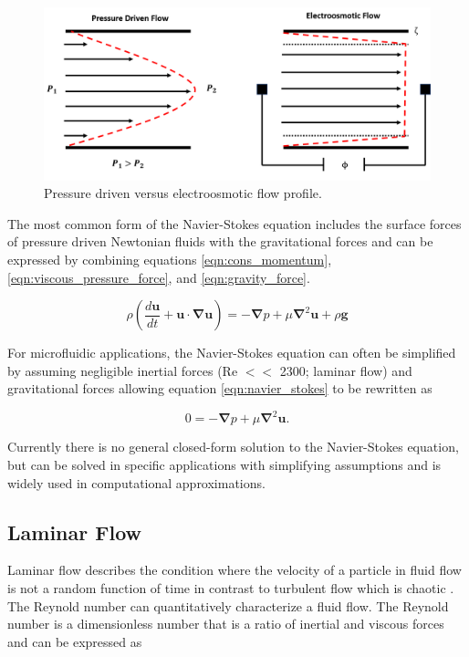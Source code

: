 \begin{figure}[ht]
    \centering
    \includegraphics[width = \textwidth]{images/plugVsParabolic.png}
    \caption[Pressure driven versus electroosmotic flow profile]{Pressure driven versus electroosmotic flow profile. }
    \label{fig:plug_vs_parabolic_flow}
\end{figure}

\par The most common form of the Navier-Stokes equation includes the surface forces of pressure driven Newtonian fluids with the gravitational forces and can be expressed by combining equations \ref{eqn:cons_momentum}, \ref{eqn:viscous_pressure_force}, and \ref{eqn:gravity_force}. 

\begin{equation}
    \rho(\frac{d\textbf{u}}{dt} + \textbf{u}\cdot\boldsymbol{\nabla}\textbf{u}) = -\boldsymbol{\nabla}p + \mu\boldsymbol{\nabla}^2\textbf{u} + \rho \textbf{g}
    \label{eqn:navier_stokes}
\end{equation}

\noindent For microfluidic applications, the Navier-Stokes equation can often be simplified by assuming negligible inertial forces (Re $<<$ 2300; laminar flow) and gravitational forces allowing equation \ref{eqn:navier_stokes} to be rewritten as

\begin{equation}
        0 = -\boldsymbol{\nabla}p + \mu\boldsymbol{\nabla}^2\textbf{u}.
\end{equation}

\par Currently there is no general closed-form solution to the Navier-Stokes equation, but can be solved in specific applications with simplifying assumptions and is widely used in computational approximations.

\subsection*{Laminar Flow}
\par Laminar flow describes the condition where the velocity of a particle in fluid flow is not a random function of time in contrast to turbulent flow which is chaotic \cite{pamb}. The Reynold number can quantitatively characterize a fluid flow. The Reynold number is a dimensionless number that is a ratio of inertial and viscous forces and can be expressed as

